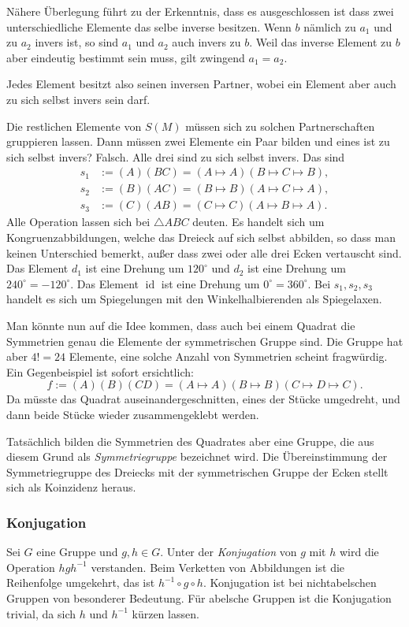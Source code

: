 \documentclass[a4paper,11pt,fleqn,twoside]{scrartcl}
\numberwithin{equation}{section}
\newcommand{\id}{\operatorname{id}}
\newcommand{\emdef}[1]{\emph{#1}}
\begin{document}
Nähere Überlegung führt zu der Erkenntnis, dass es ausgeschlossen
ist dass zwei unterschiedliche Elemente das selbe inverse besitzen.
Wenn $b$ nämlich
zu $a_1$ und zu $a_2$ invers ist, so sind $a_1$ und $a_2$ auch invers
zu $b$. Weil das inverse Element zu $b$ aber eindeutig bestimmt sein
muss, gilt zwingend $a_1=a_2$.

Jedes Element besitzt also seinen inversen Partner,
wobei ein Element aber auch zu sich selbst invers sein darf.

Die restlichen Elemente von $S(M)$ müssen sich zu solchen
Partnerschaften gruppieren lassen. Dann müssen zwei Elemente
ein Paar bilden und eines ist zu sich selbst invers? Falsch.
Alle drei sind zu sich selbst invers. Das sind
\begin{align}\label{eq:Spiegelung1}
s_1&:= (A)(BC) = (A\mapsto A)(B\mapsto C\mapsto B),\\
s_2&:= (B)(AC) = (B\mapsto B)(A\mapsto C\mapsto A),\\
s_3&:= (C)(AB) = (C\mapsto C)(A\mapsto B\mapsto A).
\end{align}
Alle Operation lassen sich bei $\triangle ABC$ deuten.
Es handelt sich um Kongruenzabbildungen, welche das Dreieck
auf sich selbst abbilden, so dass man keinen Unterschied
bemerkt, außer dass zwei oder alle drei Ecken vertauscht sind.
Das Element $d_1$ ist eine Drehung um $120^\circ$ und $d_2$ ist
eine Drehung um $240^\circ = -120^\circ$. Das Element $\id$
ist eine Drehung um $0^\circ = 360^\circ$. Bei $s_1,s_2,s_3$
handelt es sich um Spiegelungen mit den Winkelhalbierenden
als Spiegelaxen.

Man könnte nun auf die Idee kommen, dass auch bei einem Quadrat
die Symmetrien genau die Elemente der symmetrischen Gruppe sind.
Die Gruppe hat aber $4!=24$ Elemente, eine solche Anzahl von
Symmetrien scheint fragwürdig. Ein Gegenbeispiel ist sofort
ersichtlich:
\begin{equation}
f := (A)(B)(CD) = (A\mapsto A)(B\mapsto B)(C\mapsto D\mapsto C).
\end{equation}
Da müsste das Quadrat auseinandergeschnitten, eines der Stücke
umgedreht, und dann beide Stücke wieder zusammengeklebt werden.

Tatsächlich bilden die Symmetrien des Quadrates aber eine Gruppe,
die aus diesem Grund als \emph{Symmetriegruppe} bezeichnet wird.
Die Übereinstimmung der Symmetriegruppe des Dreiecks mit der
symmetrischen Gruppe der Ecken stellt sich als Koinzidenz heraus.

\subsubsection{Konjugation}
Sei $G$ eine Gruppe und $g,h\in G$. Unter der \emdef{Konjugation}
von $g$ mit $h$ wird die Operation $hgh^{-1}$ verstanden. Beim
Verketten von Abbildungen ist die Reihenfolge umgekehrt, das ist
$h^{-1}\circ g\circ h$. Konjugation ist bei nichtabelschen Gruppen
von besonderer Bedeutung. Für abelsche Gruppen ist die Konjugation
trivial, da sich $h$ und $h^{-1}$ kürzen lassen.
\end{document}
